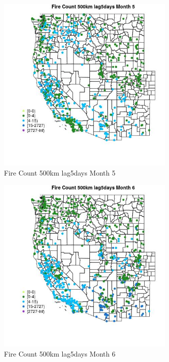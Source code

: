 \begin{figure} 
\centering  
\includegraphics[width=0.77\textwidth]{Code_Outputs/Report_ML_input_PM25_Step4_part_f_de_duplicated_aveswNAs_MapObsMo5Fire_Count_500km_lag5days.jpg} 
\caption{\label{fig:Report_ML_input_PM25_Step4_part_f_de_duplicated_aveswNAsMapObsMo5Fire_Count_500km_lag5days}Fire Count 500km lag5days Month 5} 
\end{figure} 
 

\begin{figure} 
\centering  
\includegraphics[width=0.77\textwidth]{Code_Outputs/Report_ML_input_PM25_Step4_part_f_de_duplicated_aveswNAs_MapObsMo6Fire_Count_500km_lag5days.jpg} 
\caption{\label{fig:Report_ML_input_PM25_Step4_part_f_de_duplicated_aveswNAsMapObsMo6Fire_Count_500km_lag5days}Fire Count 500km lag5days Month 6} 
\end{figure} 
 

